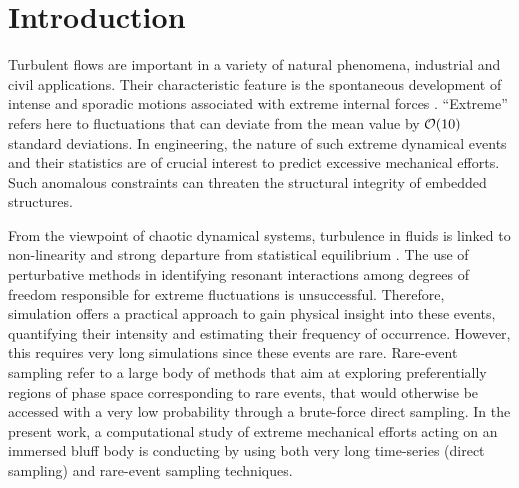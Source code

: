 \documentclass[pre,aps,floatfix,10pt,superscriptaddress, notitlepage,preprint]{revtex4-1}
\begin{document}
\maketitle
	
\section{Introduction}
	
%
Turbulent flows are important in a variety of natural phenomena, industrial and civil applications.
Their characteristic feature is the spontaneous development of intense and sporadic motions associated with extreme internal forces \cite{lesieur_book,donzis_sreenivasan_2010,Yeung}.
``Extreme'' refers here to fluctuations that can deviate from the mean value by ${\cal{O}}(10)$ standard deviations.
In engineering, the nature of such extreme dynamical events and their statistics are of crucial interest to predict excessive mechanical efforts.
Such anomalous constraints can threaten the structural integrity of embedded structures.
%

From the viewpoint of chaotic dynamical systems, turbulence in fluids is linked to non-linearity and strong departure from statistical equilibrium \cite{KRAICHNAN}.
The use of perturbative methods in identifying resonant interactions among degrees of freedom responsible for extreme fluctuations is unsuccessful.
Therefore, simulation offers a practical approach to gain physical insight into these events, quantifying their intensity and estimating their frequency of occurrence.
However, this requires very long simulations since these events are rare.
%
{Rare-event sampling refer to a large body of methods that aim at exploring preferentially regions of phase space corresponding to rare events, that would otherwise be accessed with a very low probability through a brute-force direct sampling.}
%
In the present work, a computational study of extreme mechanical efforts acting on an immersed bluff body is conducting by using both very long time-series (direct sampling) and rare-event sampling techniques.
%	
	
\end{document}
